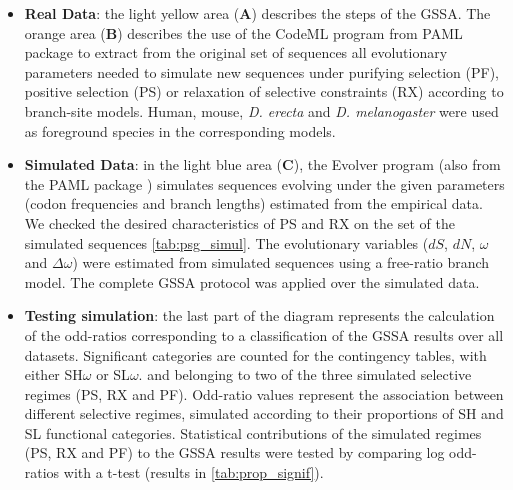 \begin{itemize}
\item \textbf{Real Data}: the light yellow area (\textbf{A}) describes the steps of the GSSA. The orange area (\textbf{B}) describes the use of the CodeML program from PAML package \cite{Yang2007} to extract from the original set of sequences all evolutionary parameters needed to simulate new sequences under purifying selection (PF), positive selection (PS) or relaxation of selective constraints (RX) according to branch-site models. Human, mouse, \textit{D. erecta} and \textit{D. melanogaster} were used as foreground species in the corresponding models.
  
\item \textbf{Simulated Data}: in the light blue area (\textbf{C}), the Evolver program (also from the PAML package \cite{Yang2007}) simulates sequences evolving under the given parameters (codon frequencies and branch lengths) estimated from the empirical data. We checked the desired characteristics of PS and RX on the set of the simulated sequences \autoref{tab:psg_simul}. The evolutionary variables ($dS$, $dN$, $\omega$ and $\Delta\omega$) were estimated from simulated sequences using a free-ratio branch model. The complete GSSA protocol was applied over the simulated data.
  
\item \textbf{Testing simulation}: the last part of the diagram represents the calculation of the odd-ratios corresponding to a classification of the GSSA results over all datasets. Significant categories are counted for the contingency tables, with either SH$\omega$ or SL$\omega$. and belonging to two of the three simulated selective regimes (PS, RX and PF). Odd-ratio values represent the association between different selective regimes, simulated according to their proportions of SH and SL functional categories. Statistical contributions of the simulated regimes (PS, RX and PF) to the GSSA results were tested by comparing log odd-ratios with a t-test (results in \autoref{tab:prop_signif}).
\end{itemize}


